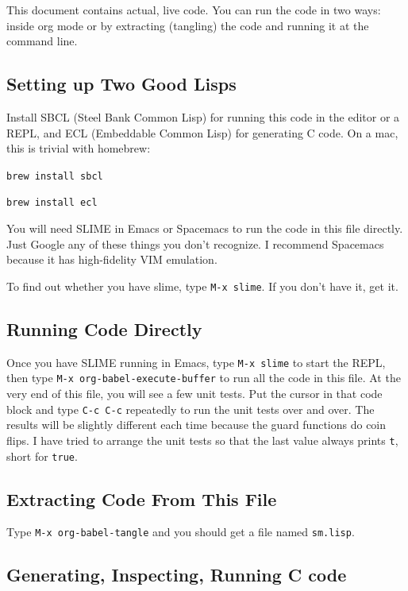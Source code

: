 \documentclass[10pt,oneside,x11names]{article}
\begin{document}
This document contains actual, live code. You can run the code in two ways:
inside org mode or by extracting (tangling) the code and running it at the
command line.

\subsection{Setting up Two Good Lisps}
\label{sec:org186676b}

Install SBCL (Steel Bank Common Lisp) for running this code in the editor or
a REPL, and ECL (Embeddable Common Lisp) for generating C code. On a mac,
this is trivial with homebrew:

\texttt{brew install sbcl}

\texttt{brew install ecl}

You will need SLIME in Emacs or Spacemacs to run the code in this file
directly. Just Google any of these things you don't recognize. I recommend
Spacemacs because it has high-fidelity VIM emulation.

To find out whether you have slime, type \texttt{M-x slime}. If you don't have it,
get it.

\subsection{Running Code Directly}
\label{sec:org1444305}

Once you have SLIME running in Emacs, type \texttt{M-x slime} to start the REPL,
then type \texttt{M-x org-babel-execute-buffer} to run all the code in this file. At
the very end of this file, you will see a few unit tests. Put the cursor in
that code block and type \texttt{C-c C-c} repeatedly to run the unit tests over and
over. The results will be slightly different each time because the guard
functions do coin flips. I have tried to arrange the unit tests so that the
last value always prints \texttt{t}, short for \texttt{true}.

\subsection{Extracting Code From This File}
\label{sec:orge32d444}

Type \texttt{M-x org-babel-tangle} and you should get a file named \texttt{sm.lisp}.

\subsection{Generating, Inspecting, Running C code}
\label{sec:org9bbf46b}
\end{document}
